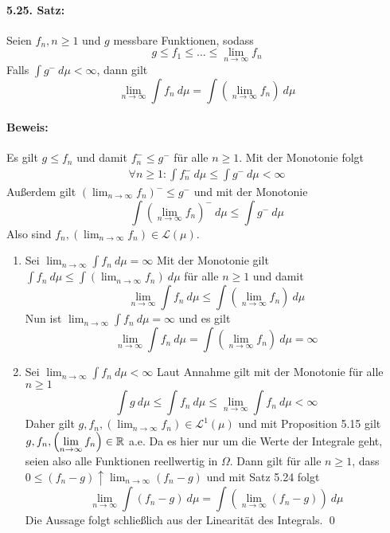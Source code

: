 \documentclass[12pt]{report}
\begin{document}
 \paragraph{5.25. Satz:}Seien $f_n,n\geq1$ und $g$ messbare Funktionen, sodass 
 $$g\leq f_1\leq\hdots\leq\lim_{n\to\infty}f_n$$
 Falls $\displaystyle\int g^-\ d\mu<\infty$, dann gilt
 $$\lim_{n\to\infty}\int f_n\ d\mu=\int \left(\lim_{n\to\infty}f_n\right)\ d\mu$$
 
 \paragraph{Beweis:} Es gilt $g\leq f_n$ und damit $f_n^-\leq g^-$ f\"ur alle $n\geq1$. Mit der Monotonie folgt
 \begin{align*}
     \forall n\geq1:\int f_n^-\ d\mu\leq \int g^-\ d\mu<\infty
 \end{align*}
 Au\ss{}erdem gilt $\displaystyle\left(\lim_{n\to\infty}f_n\right)^-\leq g^-$ und mit der Monotonie
$$\int \left(\lim_{n\to\infty}f_n\right)^-\ d\mu\leq \int g^-\ d\mu$$
Also sind $\displaystyle f_n,\left(\lim_{n\to\infty}f_n\right)\in\mathcal{L}(\mu)$. 
 \begin{enumerate}[label=\Roman*.]
     \item Sei $\displaystyle\lim_{n\to\infty}\int f_n\ d\mu=\infty$\newline
     Mit der Monotonie gilt $\displaystyle\int f_n\ d\mu\leq \int\left(\lim_{n\to\infty}f_n\right)\ d\mu$ f\"ur alle $n\geq1$ und damit 
     $$\lim_{n\to\infty}\int f_n\ d\mu\leq \int\left(\lim_{n\to\infty}f_n\right)\ d\mu$$
     Nun ist $\displaystyle\lim_{n\to\infty}\int f_n\ d\mu=\infty$ und es gilt 
     $$\lim_{n\to\infty}\int f_n\ d\mu=\int\left(\lim_{n\to\infty}f_n\right)\ d\mu=\infty$$
     \item Sei $\displaystyle\lim_{n\to\infty}\int f_n\ d\mu<\infty$\newline
     Laut Annahme gilt mit der Monotonie f\"ur alle $n\geq1$
     $$\int g\ d\mu\leq\int f_n\ d\mu\leq\lim_{n\to\infty}\int f_n\ d\mu<\infty$$
     Daher gilt $\displaystyle g,f_n,\left(\lim_{n\to\infty}f_n\right)\in\mathcal{L}^1(\mu)$ und mit Proposition 5.15 gilt $\displaystyle g,f_n,\left(\lim_{n\to\infty}f_n\right)\in\mathbb{R}$ a.e. Da es hier nur um die Werte der Integrale geht, seien also alle Funktionen reellwertig in $\Omega$. Dann gilt f\"ur alle $n\geq1$, dass $0\leq(f_n-g)\uparrow \displaystyle\lim_{n\to\infty}(f_n-g)$ und mit Satz 5.24 folgt
     $$\lim_{n\to\infty}\int (f_n-g)\ d\mu=\int\left(\lim_{n\to\infty}(f_n-g)\right)\ d\mu$$ 
     Die Aussage folgt schlie\ss{}lich aus der Linearit\"at des Integrals. \qed
 \end{enumerate}
 
\end{document}
